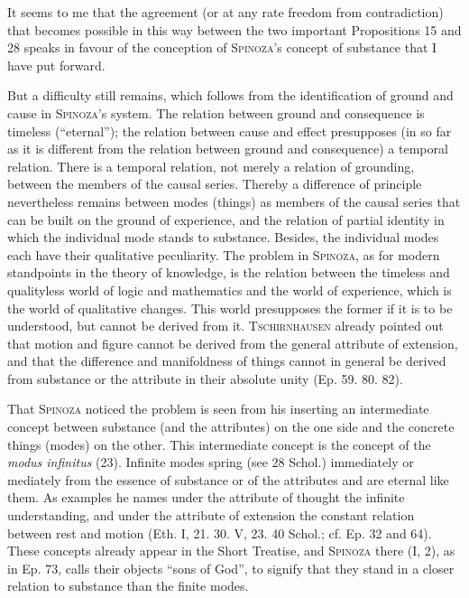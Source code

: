 \documentclass[12pt]{article}
\newcommand{\opage}[1]{\marginnote{\footnotesize\textit{[#1]}}}
\begin{document}
It seems to me that the agreement (or at any rate freedom from contradiction) that
becomes possible in this way between the two important Propositions 15 and 28 speaks in
favour of the conception of \textsc{Spinoza}'s concept of substance that I have put
forward.

But a difficulty still remains, which follows from the
identifica\opage{27}tion of ground and cause in \textsc{Spinoza}'s system. The relation
between ground and consequence is timeless (``eternal''); the relation between cause
and effect presupposes (in so far as it is different from the relation between ground
and consequence) a temporal relation. There is a temporal relation, not merely a
relation of grounding, between the members of the causal series. Thereby a difference
of principle nevertheless remains between modes (things) as members of the causal series
that can be built on the ground of experience, and the relation of partial identity in
which the individual mode stands to substance. Besides, the individual modes each have
their qualitative peculiarity. The problem in \textsc{Spinoza}, as for modern standpoints
in the theory of knowledge, is the relation between the timeless and qualityless world
of logic and mathematics and the world of experience, which is the world of qualitative
changes. This world presupposes the former if it is to be understood, but cannot be
derived from it. \textsc{Tschirnhausen} already pointed out that motion and figure cannot
be derived from the general attribute of extension, and that the difference and
manifoldness of things cannot in general be derived from substance or the attribute in
their absolute unity (Ep. 59. 80. 82).

That \textsc{Spinoza} noticed the problem is seen from his inserting an intermediate
concept between substance (and the attributes) on the one side and the concrete things
(modes) on the other. This intermediate concept is the concept of the \textit{modus
infinitus} (23). Infinite modes spring (see 28 Schol.) immediately or mediately from the
essence of substance or of the attributes and are eternal like them. As examples he
names under the attribute of thought the infinite understanding, and under the attribute
of extension the constant relation between rest and motion (Eth. I, 21. 30. V, 23. 40
Schol.; cf. Ep. 32 and 64). These concepts already appear in the Short Treatise, and
\textsc{Spinoza} there (I, 2), as in Ep. 73, calls their objects ``sons of God'', to
signify that they stand in a closer relation to substance than the finite modes.
\end{document}
